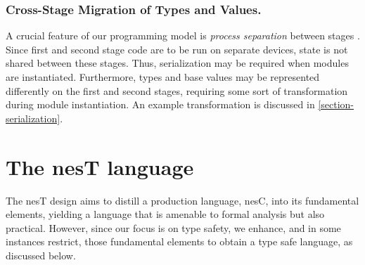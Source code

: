 %
%
%

\subsubsection{Cross-Stage Migration of Types and Values.} 

A crucial feature of our programming model is \emph{process
  separation} between stages \cite{FramedML}.  Since
  first and second stage code are 
to be run on separate devices, state is not shared between these
stages. Thus, serialization may be required when modules are
instantiated. Furthermore, types and base values may be represented
differently on the first and second stages, requiring some sort of
transformation during module instantiation.  An example transformation
is discussed in \autoref{section-serialization}.

\section{The nesT language}
\label{section-nest}
 
\syntaxfig

The nesT design aims to distill a production language, nesC,
into its fundamental elements, yielding a language that is amenable to
formal analysis but also practical. However, since our focus is on type
safety, we enhance, and in some instances restrict, those fundamental
elements to obtain a type safe language, as discussed below.

